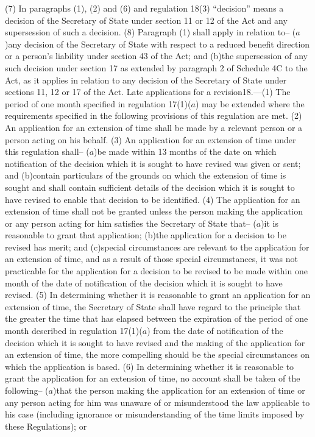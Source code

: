 \documentclass[12pt,a4paper]{article}
\begin{document}
(7) In paragraphs (1), (2) and (6) and regulation 18(3) “decision” means a decision of the Secretary of State under section 11 or 12 of the Act and any supersession of such a decision.
(8) Paragraph (1) shall apply in relation to–
($a$)any decision of the Secretary of State with respect to a reduced benefit direction or a person’s liability under section 43 of the Act; and
(b)the supersession of any such decision under section 17 as extended by paragraph 2 of Schedule 4C to the Act,
as it applies in relation to any decision of the Secretary of State under sections 11, 12 or 17 of the Act.
Late applications for a revision18.—(1) The period of one month specified in regulation 17(1)($a$) may be extended where the requirements specified in the following provisions of this regulation are met.
(2) An application for an extension of time shall be made by a relevant person or a person acting on his behalf.
(3) An application for an extension of time under this regulation shall–
($a$)be made within 13 months of the date on which notification of the decision which it is sought to have revised was given or sent; and
(b)contain particulars of the grounds on which the extension of time is sought and shall contain sufficient details of the decision which it is sought to have revised to enable that decision to be identified.
(4) The application for an extension of time shall not be granted unless the person making the application or any person acting for him satisfies the Secretary of State that–
($a$)it is reasonable to grant that application;
(b)the application for a decision to be revised has merit; and
(c)special circumstances are relevant to the application for an extension of time,
and as a result of those special circumstances, it was not practicable for the application for a decision to be revised to be made within one month of the date of notification of the decision which it is sought to have revised.
(5) In determining whether it is reasonable to grant an application for an extension of time, the Secretary of State shall have regard to the principle that the greater the time that has elapsed between the expiration of the period of one month described in regulation 17(1)($a$) from the date of notification of the decision which it is sought to have revised and the making of the application for an extension of time, the more compelling should be the special circumstances on which the application is based.
(6) In determining whether it is reasonable to grant the application for an extension of time, no account shall be taken of the following–
($a$)that the person making the application for an extension of time or any person acting for him was unaware of or misunderstood the law applicable to his case (including ignorance or misunderstanding of the time limits imposed by these Regulations); or
\end{document}
